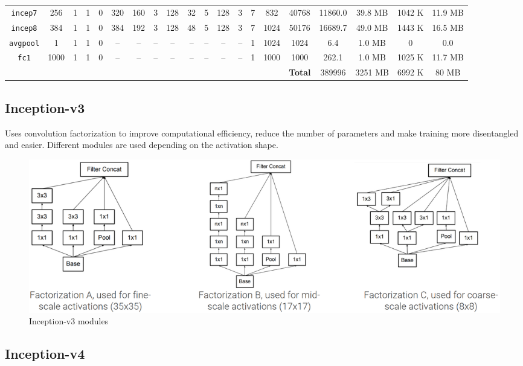 \begin{table}[H]
\begin{tabular}{cccccccccccccccccccc}
        \texttt{incep7}  & 256  & 1  & 1  & 0  & 320 & 160 & 3  & 128 & 32  & 5  & 128 & 3  & 7   & \num{832}  & \num{40768}  & \num{11860.0} & \num{39.8} {\tiny MB}  & \num{1042} {\tiny K} & \num{11.9} {\tiny MB} \\
        \texttt{incep8}  & 384  & 1  & 1  & 0  & 384 & 192 & 3  & 128 & 48  & 5  & 128 & 3  & 7   & \num{1024} & \num{50176}  & \num{16689.7} & \num{49.0} {\tiny MB}  & \num{1443} {\tiny K} & \num{16.5} {\tiny MB} \\
        \cmidrule(lr){1-20}
        \texttt{avgpool} & 1    & 1  & 1  & 0  & --  & --  & -- & --  & --  & -- & --  & -- & 1   & \num{1024} & \num{1024}   & \num{6.4}     & \num{1.0} {\tiny MB}   & \num{0}              & \num{0.0}             \\
        \texttt{fc1}     & 1000 & 1  & 1  & 0  & --  & --  & -- & --  & --  & -- & --  & -- & 1   & \num{1000} & \num{1000}   & \num{262.1}   & \num{1.0} {\tiny MB}   & \num{1025} {\tiny K} & \num{11.7} {\tiny MB} \\
        \midrule
        &&&&&&&&&&&&&&& \textbf{Total} & \num{389996} & \num{3251} {\tiny MB} & \num{6992} {\tiny K} & \num{80} {\tiny MB} \\
        \bottomrule
    \end{tabular}
\end{table}


\subsection{Inception-v3}

Uses convolution factorization to improve computational efficiency, reduce the number of parameters and make training more disentangled and easier.
Different modules are used depending on the activation shape.

\begin{figure}[H]
    \centering
    \includegraphics[width=0.75\linewidth]{./img/inception_v3.png}
    \caption{Inception-v3 modules}
\end{figure}


\subsection{Inception-v4}

